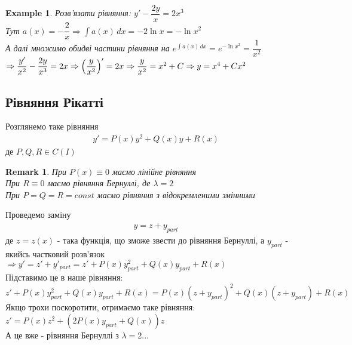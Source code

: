 \documentclass[a4paper, 10pt]{article}
\theoremstyle{theoremdd}
\theoremstyle{theoremdd}
\theoremstyle{theoremdd}
\theoremstyle{theoremdd}
\newtheorem{example}[theorem]{Example}
\theoremstyle{theoremdd}
\theoremstyle{theoremdd}
\newtheorem{remark}[theorem]{Remark}
\theoremstyle{theoremdd}
\theoremstyle{theoremdd}
\begin{document}
\begin{example}
 Розв'язати рівняння: $y' - \dfrac{2y}{x} = 2x^3$\\
Тут $a(x) = -\dfrac{2}{x} \Rightarrow \displaystyle \int a(x)\,dx = -2 \ln x = -\ln x^2$\\
А далі множимо обидві частини рівняння на $e^{\int a(x)\,dx} = e^{-\ln x^2} = \dfrac{1}{x^2}$\\
$\Rightarrow \dfrac{y'}{x^2} - \dfrac{2y}{x^3} = 2x \Rightarrow \left( \dfrac{y}{x^2} \right)' = 2x \Rightarrow \dfrac{y}{x^2} = x^2 + C \\ \Rightarrow y = x^4 + Cx^2$
\end{example}

\subsection{Рівняння Рікатті}
Розглянемо таке рівняння
\begin{align*}
y' = P(x)y^2 + Q(x)y + R(x)
\end{align*}
де $P,Q,R \in C(I)$

\begin{remark}
 При $P(x) \equiv 0$ маємо лінійне рівняння\\
При $R \equiv 0$ маємо рівняння Бернуллі, де $\lambda = 2$\\
При $P = Q = R = const$ маємо рівняння з відокремленими змінними
\end{remark}

Проведемо заміну
\begin{align*}
y = z + y_{part}
\end{align*}
де $z = z(x)$ - така функція, що зможе звести до рівняння Бернуллі, а $y_{part}$ - якийсь частковий розв'язок\\
$\Rightarrow y' = z' + y'_{part} = z' + P(x)y_{part}^2 + Q(x)y_{part} + R(x)$\\
Підставимо це в наше рівняння:\\
$z' + P(x)y_{part}^2 + Q(x)y_{part} + R(x) = P(x)(z + y_{part})^2 + Q(x)(z + y_{part}) + R(x)$\\
Якщо трохи поскоротити, отримаємо таке рівняння:\\
$z' = P(x)z^2 + (2P(x)y_{part} + Q(x))z$\\
А це вже - рівняння Бернуллі з $\lambda = 2$...
\end{document}
